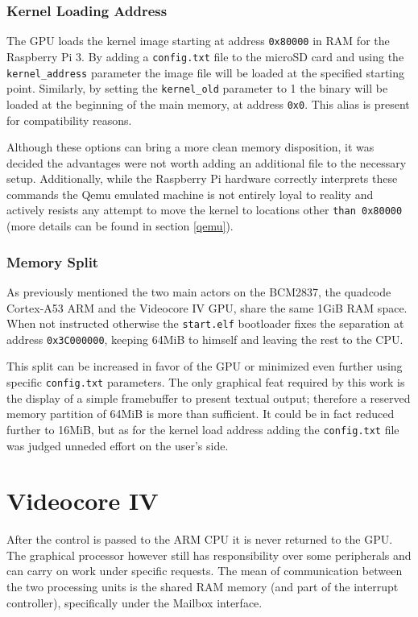 \documentclass[12pt,a4paper,openright,twoside]{report}
\begin{document}
\subsubsection{Kernel Loading Address}
The GPU loads the kernel image starting at address {\tt 0x80000} in RAM for the
Raspberry Pi 3. By adding a {\tt config.txt} file to the microSD card and using
the {\tt kernel\_address} parameter the image file will be loaded at the specified
starting point. Similarly, by setting the {\tt kernel\_old} parameter to 1 the binary
will be loaded at the beginning of the main memory, at address {\tt 0x0}. This
alias is present for compatibility reasons.

Although these options can bring a more clean memory disposition, it was decided
the advantages were not worth adding an additional file to the necessary setup.
Additionally, while the Raspberry Pi hardware correctly interprets these commands
the Qemu emulated machine is not entirely loyal to reality and actively resists
any attempt to move the kernel to locations other {\tt than 0x80000} (more details can
be found in section \ref{qemu}).

\subsubsection{Memory Split}
As previously mentioned the two main actors on the BCM2837, the quadcode Cortex-A53 ARM
and the Videocore IV GPU, share the same 1GiB RAM space. When not instructed otherwise
the {\tt start.elf} bootloader fixes the separation at address {\tt 0x3C000000}, keeping
64MiB to himself and leaving the rest to the CPU.

This split can be increased in favor of the GPU or minimized even further using
specific {\tt config.txt} parameters. The only graphical feat required by this work
is the display of a simple framebuffer to present textual output; therefore
a reserved memory partition of 64MiB is more than sufficient.
It could be in fact reduced further to 16MiB, but as for the kernel load address 
adding the {\tt config.txt} file was judged unneded effort on the user's side.

\section{Videocore IV}
After the control is passed to the ARM CPU it is never returned to the GPU.
The graphical processor however still has responsibility over some peripherals
and can carry on work under specific requests. The mean of communication 
between the two processing units is the shared RAM memory (and part of the interrupt
controller), specifically under the Mailbox interface.
\end{document}
